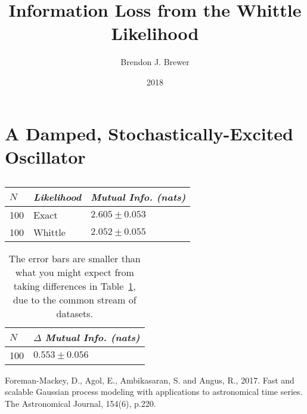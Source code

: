 \documentclass[a4paper, 12pt]{article}
\title{Information Loss from the Whittle Likelihood}
\author{Brendon J. Brewer}
\date{2018}
\begin{document}
\maketitle


\setlength{\parindent}{0pt}
\setlength{\parskip}{1em}

\section{A Damped, Stochastically-Excited Oscillator}

\begin{table}[!ht]
\centering
\begin{tabular}{|lll|}
\hline
$N$         &       {\em Likelihood}      &  {\em Mutual Info. (nats)} \\
\hline
100         &       Exact           & $2.605 \pm 0.053$ \\
100         &       Whittle         & $2.052 \pm 0.055$ \\
\hline
\end{tabular}
\caption{\label{tab:oscillator_results}}
\end{table}


\begin{table}[!ht]
\centering
\begin{tabular}{|ll|}
\hline
$N$         &       $\Delta$ {\em Mutual Info. (nats)} \\
\hline
100         &       $0.553 \pm 0.056$ \\
\hline
\end{tabular}
\caption{The error bars are smaller than what you might expect from
taking differences in Table~\ref{tab:oscillator_results}, due to
the common stream of datasets.\label{tab:oscillator_differences}}
\end{table}

\begin{thebibliography}{999}
Foreman-Mackey, D., Agol, E., Ambikasaran, S. and Angus, R., 2017. Fast and scalable Gaussian process modeling with applications to astronomical time series. The Astronomical Journal, 154(6), p.220.
\end{thebibliography}
\end{document}
